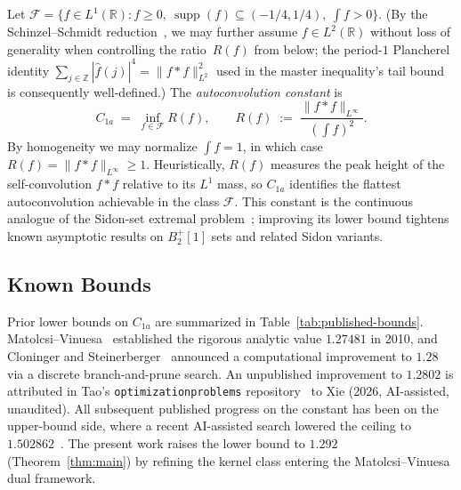 \documentclass[11pt, letterpaper]{article}
\theoremstyle{paperplain}
\theoremstyle{paperdef}
\newcommand{\R}{\mathbb{R}}
\newcommand{\Z}{\mathbb{Z}}
\newcommand{\Linf}{L^\infty}
\newcommand{\supp}{\operatorname{supp}}
\begin{document}
Let $\mathcal{F}=\{f\in L^1(\R) : f\ge 0,\
\supp(f)\subseteq(-1/4,1/4),\ \int f>0\}$.  (By the
Schinzel--Schmidt reduction~\cite{SS2002}, we may further assume
$f\in L^2(\R)$ without loss of generality when controlling the
ratio~$R(f)$ from below; the period-$1$ Plancherel identity
$\sum_{j\in\Z}|\widehat{f}(j)|^{4}=\|f*f\|_{L^{2}}^{2}$
used in the master inequality's tail bound is consequently
well-defined.)  The \emph{autoconvolution constant} is
\[
  C_{1a}
  \;=\;
  \inf_{f\in\mathcal{F}} R(f),
  \qquad
  R(f) \;:=\; \frac{\|f*f\|_{\Linf}}{\left(\int f\right)^2}.
\]
By homogeneity we may normalize $\int f=1$, in which case
$R(f)=\|f*f\|_{\Linf}\ge 1$.  Heuristically, $R(f)$ measures the
peak height of the self-convolution $f*f$ relative to its $L^1$
mass, so $C_{1a}$ identifies the flattest autoconvolution achievable
in the class $\mathcal{F}$.  This constant is the continuous
analogue of the Sidon-set extremal problem~\cite{ET41,MO2009};
improving its lower bound tightens known asymptotic results on
$B_2^{+}[1]$ sets and related Sidon variants.

\subsection{Known Bounds}\label{subsec:intro-bounds}

Prior lower bounds on $C_{1a}$ are summarized in
Table~\ref{tab:published-bounds}.  Matolcsi--Vinuesa~\cite{MV10}
established the rigorous analytic value $1.27481$ in 2010, and
Cloninger and Steinerberger~\cite{CS17} announced a computational
improvement to $1.28$ via a discrete branch-and-prune search.  An
unpublished improvement to $1.2802$ is attributed in Tao's
\texttt{optimizationproblems} repository~\cite{Xie26} to Xie (2026,
AI-assisted, unaudited).  All subsequent published progress on the
constant has been on the upper-bound side, where a recent AI-assisted
search lowered the ceiling to $1.502862$~\cite{AlphaEvolve26}.  The
present work raises the lower bound to $1.292$
(Theorem~\ref{thm:main}) by refining the kernel class entering the
Matolcsi--Vinuesa dual framework.
\end{document}
